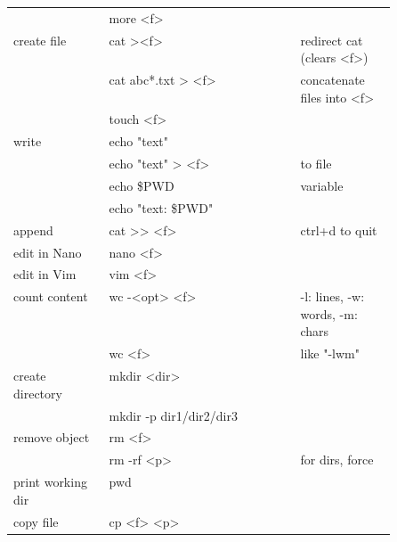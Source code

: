{\begin{tabularx}{\linewidth}{@{} p{0.25\linewidth}>{\ttfamily}lp{0.25\linewidth} @{}}
                             & more <f>                   &                                  \\
        create file          & cat ><f>                   & redirect cat (clears <f>)        \\
                             & cat abc*.txt > <f>         & concatenate files into <f>       \\
                             & touch <f>                  &                                  \\
        write                & echo "text"                &                                  \\ %
                             & echo "text" > <f>          & to file                          \\ %
                             & echo \$PWD                 & variable                         \\
                             & echo "text: \$PWD"         &                                  \\ %
        append               & cat >> <f>                 & ctrl+d to quit                   \\
        edit in Nano         & nano <f>                   &                                  \\
        edit in Vim          & vim <f>                    &                                  \\
        count content        & wc -<opt> <f>              & -l: lines, -w: words, -m: chars  \\
                             & wc <f>                     & like "-lwm"                      \\ %
        create directory     & mkdir <dir>                &                                  \\
                             & mkdir -p dir1/dir2/dir3    &                                  \\
        remove object        & rm <f>                     &                                  \\
                             & rm -rf <p>                 & for dirs, force                  \\
        print working dir    & pwd                        &                                  \\
        copy file            & cp <f> <p>                 &                                  \\

\end{tabularx}}
